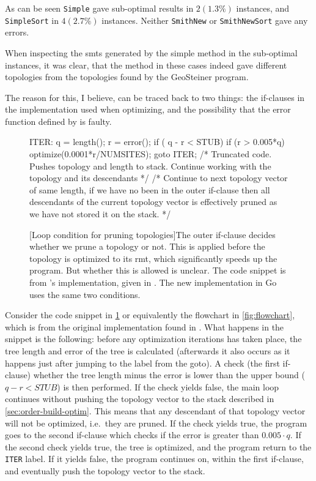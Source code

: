 As can be seen \texttt{Simple} gave sub-optimal results in $2 (1.3\%)$
instances, and \texttt{SimpleSort} in $4 (2.7\%)$ instances. Neither
\texttt{SmithNew} or \texttt{SmithNewSort} gave any errors.

When inspecting the \acp{smt} generated by the simple method in the sub-optimal
instances, it was clear, that the method in these cases indeed gave different
topologies from the topologies found by the GeoSteiner program.

The reason for this, I believe, can be traced back to two things: the
if-clauses in the implementation used when optimizing, and the possibility that
the error function defined by \citeauthor{smith1992} is faulty.

\begin{figure}[htbp]
  \begin{c-code}
    ITER:
    q = length();
    r = error();
    if ( q - r < STUB) {
      if (r > 0.005*q) {
        optimize(0.0001*r/NUMSITES);
        goto ITER;
      }
      /* Truncated code.
         Pushes topology and length to stack.
         Continue working with the topology and its descendants */
    }
    /* Continue to next topology vector of same length,
       if we have no been in the outer if-clause then all
       descendants of the current topology vector is 
       effectively pruned as we have not stored it on the stack. */
  \end{c-code}
  [Loop condition for pruning topologies]{The outer if-clause
    decides whether we prune a topology or not. This is applied before the
    topology is optimized to its \acs{rmt}, which significantly speeds up the
    program. But whether this is allowed is unclear. The code snippet is from
    \citeauthor{smith1992}'s implementation, given in \textcite{smith1992}. The new
    implementation in Go uses the same two
    conditions.\label{fig:loop-condition-pruning}}
\end{figure}

Consider the code snippet in \cref{fig:loop-condition-pruning} or equivalently
the flowchart in \cref{fig:flowchart}, which is from the original implementation
found in \textcite{smith1992}. What happens in the snippet is the following:
before any optimization iterations has taken place, the tree length and error of
the tree is calculated (afterwards it also occurs as it happens just after
jumping to the label from the goto). A check (the first if-clause) whether the
tree length minus the error is lower than the upper bound ($q-r <
\textit{STUB}$) is then performed. If the check yields false, the main loop
continues without pushing the topology vector to the stack described in
\cref{sec:order-build-optim}. This means that any descendant of that topology
vector will not be optimized, i.e.\ they are pruned. If the check yields true,
the program goes to the second if-clause which checks if the error is greater
than $0.005 \cdot q$. If the second check yields true, the tree is optimized,
and the program return to the \texttt{ITER} label. If it yields false, the
program continues on, within the first if-clause, and eventually push the
topology vector to the stack.

